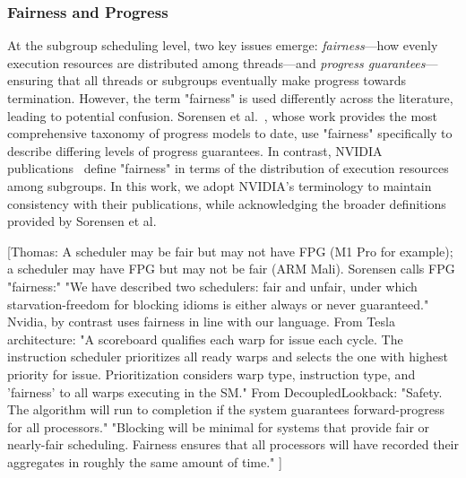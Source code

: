 \documentclass[sigconf]{acmart}
\newcommand{\thomas}[1]{{\footnotesize\color{orange}[Thomas: #1]}}
\begin{document}
\subsubsection{Fairness and Progress}
At the subgroup scheduling level, two key issues emerge: \emph{fairness}---how evenly execution resources are distributed among threads---and \emph{progress guarantees}---ensuring that all threads or subgroups eventually make progress towards termination. However, the term "fairness" is used differently across the literature, leading to potential confusion. Sorensen et al.~\cite{10.1145/3022671.2984032, sorensen_et_al:LIPIcs.CONCUR.2018.23, 10.1145/3485508}, whose work provides the most comprehensive taxonomy of progress models to date, use "fairness" specifically to describe differing levels of progress guarantees. In contrast, NVIDIA publications~\cite{4523358, Merrill2016} define "fairness" in terms of the distribution of execution resources among subgroups. In this work, we adopt NVIDIA's terminology to maintain consistency with their publications, while acknowledging the broader definitions provided by Sorensen et al.

\thomas{A scheduler may be fair but may not have FPG (M1 Pro for example); a scheduler may have FPG but may not be fair (ARM Mali). \newline
Sorensen calls FPG "fairness:" "We have described two schedulers: fair and unfair, under which starvation-freedom for blocking idioms is either always or never guaranteed."\newline
Nvidia, by contrast uses fairness in line with our language. From Tesla architecture: \newline
"A scoreboard qualifies each warp for issue each cycle. The instruction scheduler prioritizes all ready warps and selects the one with highest priority for issue. Prioritization considers warp type, instruction type, and 'fairness' to all warps executing in the SM\@." \newline
From DecoupledLookback: \newline
"Safety. The algorithm will run to completion if the system guarantees forward-progress for all processors." \newline
"Blocking will be minimal for systems that provide fair or nearly-fair scheduling. Fairness ensures that all processors will have recorded their aggregates in roughly the same amount of time."
}
\end{document}
